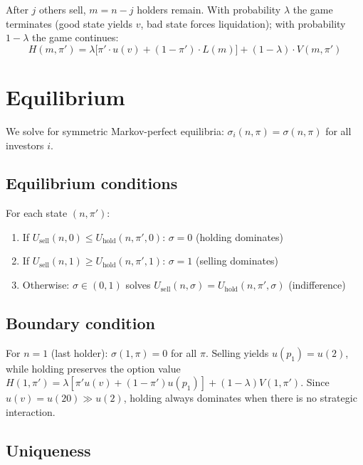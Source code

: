 \documentclass[11pt]{article}
\begin{document}
After $j$ others sell, $m = n - j$ holders remain. With probability $\lambda$
the game terminates (good state yields $v$, bad state forces liquidation); with
probability $1 - \lambda$ the game continues:
\begin{equation}
    H(m, \pi')
    = \lambda \bigl[\pi' \cdot u(v) + (1-\pi') \cdot L(m)\bigr]
    + (1-\lambda) \cdot V(m, \pi')
    \label{eq:continuation}
\end{equation}

\section{Equilibrium}

We solve for symmetric Markov-perfect equilibria: $\sigma_i(n,\pi) = \sigma(n,\pi)$ for all investors $i$.

\subsection{Equilibrium conditions}

For each state $(n, \pi')$:
\begin{enumerate}
    \item If $U_{\text{sell}}(n, 0) \leq U_{\text{hold}}(n, \pi', 0)$:
          $\sigma = 0$ \quad (holding dominates)
    \item If $U_{\text{sell}}(n, 1) \geq U_{\text{hold}}(n, \pi', 1)$:
          $\sigma = 1$ \quad (selling dominates)
    \item Otherwise: $\sigma \in (0,1)$ solves
          $U_{\text{sell}}(n, \sigma) = U_{\text{hold}}(n, \pi', \sigma)$
          \quad (indifference)
\end{enumerate}

\subsection{Boundary condition}

For $n = 1$ (last holder): $\sigma(1, \pi) = 0$ for all $\pi$. Selling yields
$u(p_1) = u(2)$, while holding preserves the option value
$H(1,\pi') = \lambda[\pi' u(v) + (1-\pi')u(p_1)] + (1-\lambda)V(1,\pi')$.
Since $u(v) = u(20) \gg u(2)$, holding always dominates when there is no
strategic interaction.

\subsection{Uniqueness}
\end{document}

